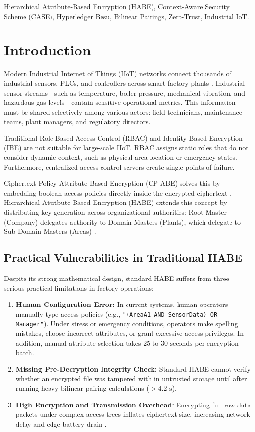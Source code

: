 \documentclass[conference]{IEEEtran}
\begin{document}
\begin{IEEEkeywords}
Hierarchical Attribute-Based Encryption (HABE), Context-Aware Security Scheme (CASE), Hyperledger Besu, Bilinear Pairings, Zero-Trust, Industrial IoT.
\end{IEEEkeywords}

\section{Introduction}
Modern Industrial Internet of Things (IIoT) networks connect thousands of industrial sensors, PLCs, and controllers across smart factory plants \cite{misra2021detour, fukuyama2018society}. Industrial sensor streams—such as temperature, boiler pressure, mechanical vibration, and hazardous gas levels—contain sensitive operational metrics. This information must be shared selectively among various actors: field technicians, maintenance teams, plant managers, and regulatory directors.

Traditional Role-Based Access Control (RBAC) and Identity-Based Encryption (IBE) are not suitable for large-scale IIoT. RBAC assigns static roles that do not consider dynamic context, such as physical area location or emergency states. Furthermore, centralized access control servers create single points of failure.

Ciphertext-Policy Attribute-Based Encryption (CP-ABE) solves this by embedding boolean access policies directly inside the encrypted ciphertext \cite{bethencourt2007cpabe}. Hierarchical Attribute-Based Encryption (HABE) extends this concept by distributing key generation across organizational authorities: Root Master (Company) delegates authority to Domain Masters (Plants), which delegate to Sub-Domain Masters (Areas) \cite{wang2011habe}.

\subsection{Practical Vulnerabilities in Traditional HABE}
Despite its strong mathematical design, standard HABE suffers from three serious practical limitations in factory operations:
\begin{enumerate}
    \item \textbf{Human Configuration Error:} In current systems, human operators manually type access policies (e.g., \texttt{"(AreaA1 AND SensorData) OR Manager"}). Under stress or emergency conditions, operators make spelling mistakes, choose incorrect attributes, or grant excessive access privileges. In addition, manual attribute selection takes $25\text{ to }30\text{ seconds}$ per encryption batch.
    \item \textbf{Missing Pre-Decryption Integrity Check:} Standard HABE cannot verify whether an encrypted file was tampered with in untrusted storage until after running heavy bilinear pairing calculations ($>4.2\text{ s}$).
    \item \textbf{High Encryption and Transmission Overhead:} Encrypting full raw data packets under complex access trees inflates ciphertext size, increasing network delay and edge battery drain \cite{ghosh2022case}.
\end{enumerate}
\end{document}

